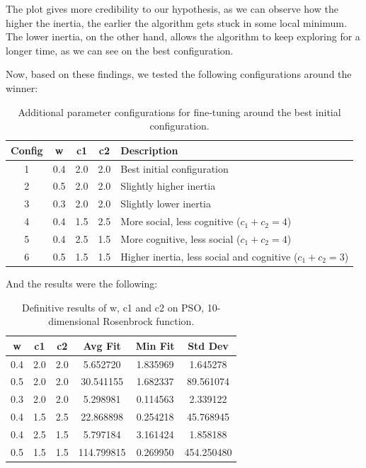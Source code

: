 \documentclass[12pt,a4paper]{article}
\begin{document}
\begin{itemize}
        The plot gives more credibility to our hypothesis, as we can observe how the higher the inertia, the earlier the algorithm gets stuck in some local minimum. The lower inertia, on the other hand, allows the algorithm to keep exploring for a longer time, as we can see on the best configuration.
            
        Now, based on these findings, we tested the following configurations around the winner:
         \begin{table}[H]
                \centering
                \begin{tabular}{c c c c l}
                \hline
                \textbf{Config} & \textbf{w} & \textbf{c1} & \textbf{c2} & \textbf{Description} \\
                \hline
                1 & 0.4 & 2.0 & 2.0 & Best initial configuration \\
                2 & 0.5 & 2.0 & 2.0 & Slightly higher inertia \\
                3 & 0.3 & 2.0 & 2.0 & Slightly lower inertia \\
                4 & 0.4 & 1.5 & 2.5 & More social, less cognitive ($c_1 + c_2 = 4$) \\
                5 & 0.4 & 2.5 & 1.5 & More cognitive, less social ($c_1 + c_2 = 4$) \\
                6 & 0.5 & 1.5 & 1.5 & Higher inertia, less social and cognitive ($c_1 + c_2 = 3$) \\
                \hline
                \end{tabular}
                \caption{Additional parameter configurations for fine-tuning around the best initial configuration.}
        \end{table}
        
        And the results were the following:
        \begin{table}[H]
        \centering
        \begin{tabular}{c c c c c c}
        \hline
        \textbf{w} & \textbf{c1} & \textbf{c2} & \textbf{Avg Fit} & \textbf{Min Fit} & \textbf{Std Dev} \\
        \hline
        0.4 & 2.0 & 2.0 & 5.652720 & 1.835969 & 1.645278 \\
        0.5 & 2.0 & 2.0 & 30.541155 & 1.682337 & 89.561074 \\
        0.3 & 2.0 & 2.0 & 5.298981 & 0.114563 & 2.339122 \\
        0.4 & 1.5 & 2.5 & 22.868898 & 0.254218 & 45.768945 \\
        0.4 & 2.5 & 1.5 & 5.797184 & 3.161424 & 1.858188 \\
        0.5 & 1.5 & 1.5 & 114.799815 & 0.269950 & 454.250480 \\
        \hline
        \end{tabular}
        \caption{Definitive results of w, c1 and c2 on PSO, 10-dimensional Rosenbrock function.}
        \end{table}


\end{itemize}
\end{document}
